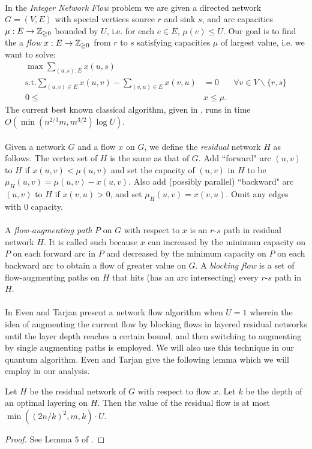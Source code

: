 \paragraph{}
In the {\it Integer Network Flow} problem we are given a directed network $G=(V,E)$ with special vertices source $r$ and sink $s$, and arc capacities $\mu : E \rightarrow \mathbb{Z}_{\geq 0}$ bounded by $U$, i.e. for each $e \in E$, $\mu(e) \leq U$. Our goal is to find the a {\it flow} $x: E \rightarrow \mathbb{Z}_{\geq 0}$ from $r$ to $s$ satisfying capacities $\mu$ of largest value, i.e. we want to solve:
\begin{align*}
\max \sum_{(u,s): E} x(u,s) \\
\text{s.t.} \sum_{(u,v) \in E} x(u,v) - \sum_{(v,u) \in E} x(v,u) &= 0 &\forall v \in V\backslash\{r,s\} \\
0 \leq &x\leq \mu.
\end{align*}
The current best known classical algorithm, given in \cite{goldberg1998beyond}, runs in time $O(\min(n^{2/3}m,m^{3/2})\log U)$.
\paragraph{}
Given a network $G$ and a flow $x$ on $G$, we define the {\it residual} network $H$ as follows. The vertex set of $H$ is the same as that of $G$. Add ``forward" arc $(u,v)$ to $H$ if $ x(u,v) < \mu(u,v)$ and set the capacity of $(u,v)$ in $H$ to be $\mu_H(u,v) = \mu(u,v) - x(u,v)$. Also add (possibly parallel) ``backward" arc $(u,v)$ to $H$ if $x(v,u) > 0$, and set $\mu_H(u,v) = x(v,u)$. Omit any edges with $0$ capacity.
\paragraph{}
A {\it flow-augmenting path} $P$ on $G$ with respect to $x$ is an $r$-$s$ path in residual network $H$. It is called such because $x$ can increased by the minimum capacity on $P$ on each forward arc in $P$ and decreased by the minimum capacity on $P$ on each backward arc to obtain a flow of greater value on $G$. A {\it blocking flow} is a set of flow-augmenting paths on $H$ that hits (has an arc intersecting) every $r$-$s$ path in $H$.
\paragraph{}
In \cite{even1975network} Even and Tarjan present a network flow algorithm when $U=1$ wherein the idea of augmenting the current flow by blocking flows in layered residual networks until the layer depth reaches a certain bound, and then switching to augmenting by single augmenting paths is employed. We will also use this technique in our quantum algorithm. Even and Tarjan give the following lemma which we will employ in our analysis.
\begin{lemma}\label{lemma:5}
\cite{even1975network}\cite{ambainis2006quantum} Let $H$ be the residual network of $G$ with respect to flow $x$. Let $k$ be the depth of an optimal layering on $H$. Then the value of the residual flow is at most $\min((2n/k)^2,m,k)\cdot U$.
\end{lemma}
\begin{proof}
See Lemma $5$ of \cite{ambainis2006quantum}.
\end{proof}
